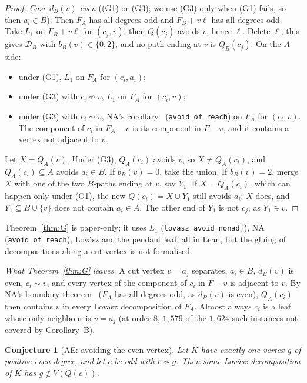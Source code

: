 \documentclass[11pt]{amsart}
\newtheorem{conjecture}[theorem]{Conjecture}
\theoremstyle{definition}
\newcommand{\cD}{\mathcal D}
\newcommand{\lean}[1]{\quad{\footnotesize[Lean: \texttt{#1}]}}
\begin{document}
\begin{proof}
\emph{Case $d_B(v)$ even} ((G1) or (G3); we use (G3) only when (G1) fails, so then $a_i\in B$). Then $F_A$ has all degrees odd and $F_B+v\ell$ has all
degrees odd. Take $L_1$ on $F_B+v\ell$ for $(c_j,v)$; then $Q(c_j)$ avoids $v$, hence $\ell$. Delete $\ell$;
this gives $\cD_B$ with $b_B(v)\in\{0,2\}$, and no path ending at $v$ is $Q_B(c_j)$. On the $A$ side:
\begin{itemize}
\item under (G1), $L_1$ on $F_A$ for $(c_i,a_i)$;
\item under (G3) with $c_i\not\sim v$, $L_1$ on $F_A$ for $(c_i,v)$;
\item under (G3) with $c_i\sim v$, NA's corollary~\cite[Cor.~1.3]{NA} (\texttt{avoid\_of\_reach}) on $F_A$ for $(c_i,v)$. The component of $c_i$
in $F_A-v$ is its component in $F-v$, and it contains a vertex not adjacent to $v$.
\end{itemize}
Let $X=Q_A(v)$. Under (G3), $Q_A(c_i)$ avoids $v$, so $X\ne Q_A(c_i)$, and $Q_A(c_i)\subseteq A$
avoids $a_i\in B$. If $b_B(v)=0$, take the union. If $b_B(v)=2$, merge $X$ with one of the two
$B$-paths ending at $v$, say $Y_1$. If $X=Q_A(c_i)$, which can happen only under (G1), the new $Q(c_i)=X\cup Y_1$ still avoids
$a_i$: $X$ does, and $Y_1\subseteq B\cup\{v\}$ does not contain $a_i\in A$. The other end of $Y_1$ is
not $c_j$, as $Y_1\ni v$.
\end{proof}

Theorem~\ref{thm:G} is paper-only; it uses $L_1$ (\texttt{lovasz\_avoid\_nonadj}), NA
(\texttt{avoid\_of\_reach}), Lov\'asz and the pendant leaf, all in Lean, but the gluing of
decompositions along a cut vertex is not formalised.

\emph{What Theorem~\ref{thm:G} leaves.} A cut vertex $v=a_j$ separates, $a_i\in B$, $d_B(v)$ is even,
$c_i\sim v$, and every vertex of the component of $c_i$ in $F-v$ is adjacent to $v$. By NA's boundary theorem~\cite[Thm.~1.4]{NA}
($F_A$ has all degrees odd, as $d_B(v)$ is even), $Q_A(c_i)$ then contains $v$ in every Lov\'asz decomposition of $F_A$. Almost always $c_i$ is a leaf whose
only neighbour is $v=a_j$ (at order $8$, $1{,}579$ of the $1{,}624$ such instances not covered by
Corollary~B).

\begin{conjecture}[AE: avoiding the even vertex]\label{conj:AE}
Let $K$ have exactly one vertex $g$ of positive even degree, and let $c$ be odd with $c\not\sim g$. Then
some Lov\'asz decomposition of $K$ has $g\notin V(Q(c))$.\lean{ConjAE}
\end{conjecture}
\end{document}
